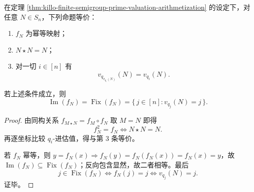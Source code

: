 \begin{corollary}[投影幂等的素数寄存器方程]\label{cor:killo-projection-idempotent-prime-register}
在定理 \ref{thm:killo-finite-semigroup-prime-valuation-arithmetization} 的设定下，对任意 \(N\in S_n\)，下列命题等价：
\begin{enumerate}
  \item \(f_N\) 为幂等映射；
  \item \(N\star N=N\)；
  \item 对一切 \(i\in[n]\) 有
  \[
  v_{q_{v_{q_i}(N)}}(N)=v_{q_i}(N).
  \]
\end{enumerate}
若上述条件成立，则
\[
\operatorname{Im}(f_N)=\operatorname{Fix}(f_N)=\{\,j\in[n]:v_{q_j}(N)=j\,\}.
\]
\end{corollary}
\begin{proof}
由同构关系
\(
f_{M\star N}=f_M\circ f_N
\)
取 \(M=N\) 即得
\[
f_N^2=f_N\iff N\star N=N.
\]
再逐坐标比较 \(q_i\)-进估值，得与第 3 条等价。

若 \(f_N\) 幂等，则 \(y=f_N(x)\Rightarrow f_N(y)=f_N(f_N(x))=f_N(x)=y\)，故 \(\operatorname{Im}(f_N)\subseteq\operatorname{Fix}(f_N)\)；反向包含显然，故二者相等。最后
\[
j\in\operatorname{Fix}(f_N)\iff f_N(j)=j\iff v_{q_j}(N)=j.
\]
证毕。
\end{proof}

